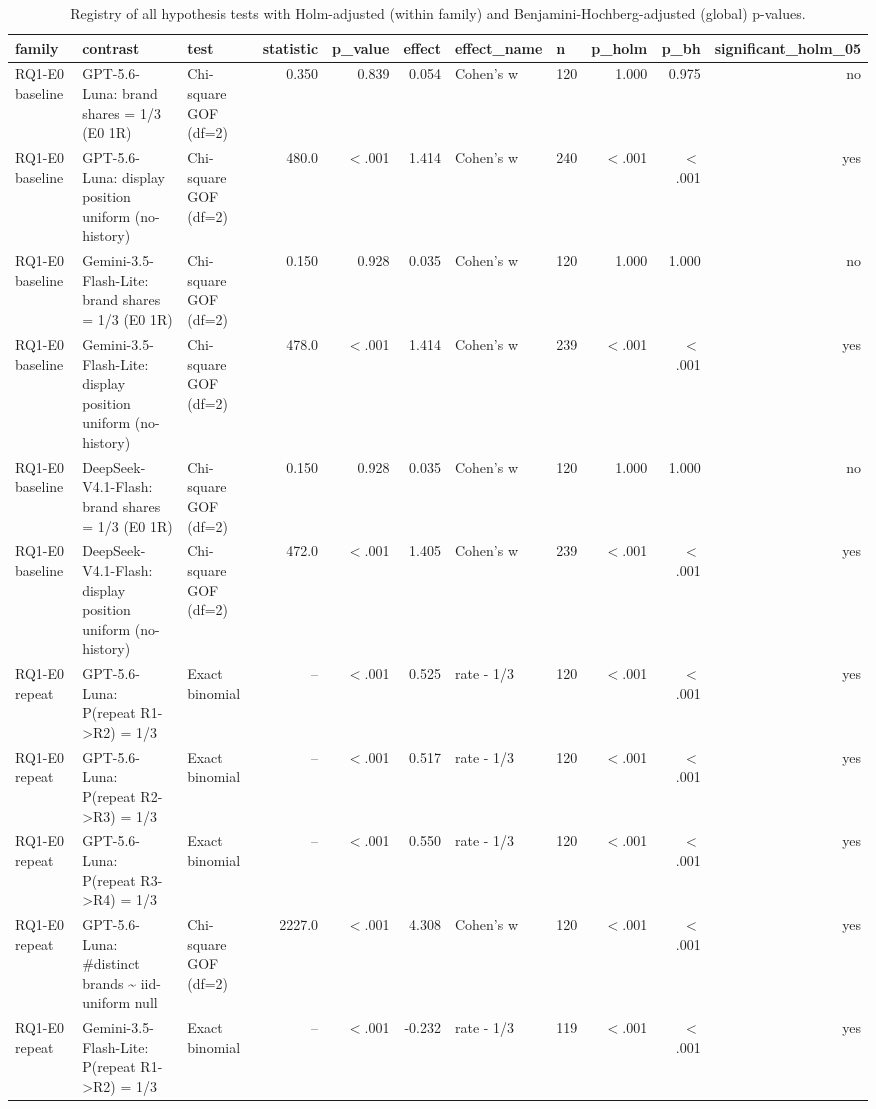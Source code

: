 \begin{table}[htbp]
\centering
\scriptsize
\caption{Registry of all hypothesis tests with Holm-adjusted (within family) and Benjamini-Hochberg-adjusted (global) p-values.}
\label{tab:tab24_all_hypothesis_tests}
\begin{tabular}{lllrrrllrrr}
\toprule
family & contrast & test & statistic & p\_value & effect & effect\_name & n & p\_holm & p\_bh & significant\_holm\_05 \\
\midrule
RQ1-E0 baseline & GPT-5.6-Luna: brand shares = 1/3 (E0 1R) & Chi-square GOF (df=2) & 0.350 & 0.839 & 0.054 & Cohen's w & 120 & 1.000 & 0.975 & no \\
RQ1-E0 baseline & GPT-5.6-Luna: display position uniform (no-history) & Chi-square GOF (df=2) & 480.0 & $<$.001 & 1.414 & Cohen's w & 240 & $<$.001 & $<$.001 & yes \\
RQ1-E0 baseline & Gemini-3.5-Flash-Lite: brand shares = 1/3 (E0 1R) & Chi-square GOF (df=2) & 0.150 & 0.928 & 0.035 & Cohen's w & 120 & 1.000 & 1.000 & no \\
RQ1-E0 baseline & Gemini-3.5-Flash-Lite: display position uniform (no-history) & Chi-square GOF (df=2) & 478.0 & $<$.001 & 1.414 & Cohen's w & 239 & $<$.001 & $<$.001 & yes \\
RQ1-E0 baseline & DeepSeek-V4.1-Flash: brand shares = 1/3 (E0 1R) & Chi-square GOF (df=2) & 0.150 & 0.928 & 0.035 & Cohen's w & 120 & 1.000 & 1.000 & no \\
RQ1-E0 baseline & DeepSeek-V4.1-Flash: display position uniform (no-history) & Chi-square GOF (df=2) & 472.0 & $<$.001 & 1.405 & Cohen's w & 239 & $<$.001 & $<$.001 & yes \\
RQ1-E0 repeat & GPT-5.6-Luna: P(repeat R1->R2) = 1/3 & Exact binomial & -- & $<$.001 & 0.525 & rate - 1/3 & 120 & $<$.001 & $<$.001 & yes \\
RQ1-E0 repeat & GPT-5.6-Luna: P(repeat R2->R3) = 1/3 & Exact binomial & -- & $<$.001 & 0.517 & rate - 1/3 & 120 & $<$.001 & $<$.001 & yes \\
RQ1-E0 repeat & GPT-5.6-Luna: P(repeat R3->R4) = 1/3 & Exact binomial & -- & $<$.001 & 0.550 & rate - 1/3 & 120 & $<$.001 & $<$.001 & yes \\
RQ1-E0 repeat & GPT-5.6-Luna: \#distinct brands \textasciitilde{} iid-uniform null & Chi-square GOF (df=2) & 2227.0 & $<$.001 & 4.308 & Cohen's w & 120 & $<$.001 & $<$.001 & yes \\
RQ1-E0 repeat & Gemini-3.5-Flash-Lite: P(repeat R1->R2) = 1/3 & Exact binomial & -- & $<$.001 & -0.232 & rate - 1/3 & 119 & $<$.001 & $<$.001 & yes \\

\end{tabular}
\end{table}

